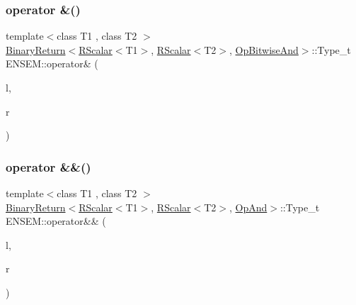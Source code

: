 \subsubsection{\texorpdfstring{operator \&()}{operator \&()}}
{\footnotesize\ttfamily template$<$class T1 , class T2 $>$ \\
\mbox{\hyperlink{structENSEM_1_1BinaryReturn}{Binary\+Return}}$<$\mbox{\hyperlink{classENSEM_1_1RScalar}{R\+Scalar}}$<$T1$>$, \mbox{\hyperlink{classENSEM_1_1RScalar}{R\+Scalar}}$<$T2$>$, \mbox{\hyperlink{structENSEM_1_1OpBitwiseAnd}{Op\+Bitwise\+And}}$>$\+::Type\+\_\+t E\+N\+S\+E\+M\+::operator\& (\begin{DoxyParamCaption}\item[{const \mbox{\hyperlink{classENSEM_1_1RScalar}{R\+Scalar}}$<$ T1 $>$ \&}]{l,  }\item[{const \mbox{\hyperlink{classENSEM_1_1RScalar}{R\+Scalar}}$<$ T2 $>$ \&}]{r }\end{DoxyParamCaption})\hspace{0.3cm}{\ttfamily [inline]}}

\mbox{\label{group__rscalar_ga142a7a22c88f64f590411925c5c3cdcd}} 
\subsubsection{\texorpdfstring{operator \&\&()}{operator \&\&()}}
{\footnotesize\ttfamily template$<$class T1 , class T2 $>$ \\
\mbox{\hyperlink{structENSEM_1_1BinaryReturn}{Binary\+Return}}$<$\mbox{\hyperlink{classENSEM_1_1RScalar}{R\+Scalar}}$<$T1$>$, \mbox{\hyperlink{classENSEM_1_1RScalar}{R\+Scalar}}$<$T2$>$, \mbox{\hyperlink{structENSEM_1_1OpAnd}{Op\+And}}$>$\+::Type\+\_\+t E\+N\+S\+E\+M\+::operator\&\& (\begin{DoxyParamCaption}\item[{const \mbox{\hyperlink{classENSEM_1_1RScalar}{R\+Scalar}}$<$ T1 $>$ \&}]{l,  }\item[{const \mbox{\hyperlink{classENSEM_1_1RScalar}{R\+Scalar}}$<$ T2 $>$ \&}]{r }\end{DoxyParamCaption})\hspace{0.3cm}{\ttfamily [inline]}}

\mbox{\label{group__rscalar_gaf7f4b83a6f16cb689121bc04a4c6f0e2}} 
